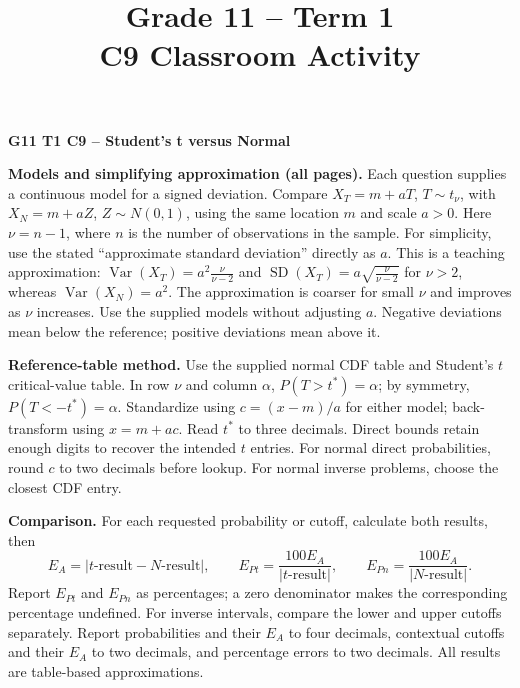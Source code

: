 \makeatletter
{}
\makeatother

\title{Grade 11 -- Term 1 \\ C9 Classroom Activity}
\author{}\date{}
\pagestyle{empty}
\linespread{1.04}
\setlength{\parskip}{3pt}

	\begin{center}{\large\bfseries G11 T1 C9 -- Student's t versus Normal}\end{center}
	\textbf{Models and simplifying approximation (all pages).} Each question supplies a continuous model for a signed deviation. Compare $X_T=m+aT$, $T\sim t_\nu$, with $X_N=m+aZ$, $Z\sim N(0,1)$, using the same location $m$ and scale $a>0$. Here $\boxed{\nu=n-1}$, where $n$ is the number of observations in the sample. For simplicity, use the stated ``approximate standard deviation'' directly as $a$. This is a teaching approximation: $\operatorname{Var}(X_T)=a^2\frac{\nu}{\nu-2}$ and $\operatorname{SD}(X_T)=a\sqrt{\frac{\nu}{\nu-2}}$ for $\nu>2$, whereas $\operatorname{Var}(X_N)=a^2$. The approximation is coarser for small $\nu$ and improves as $\nu$ increases. Use the supplied models without adjusting $a$. Negative deviations mean below the reference; positive deviations mean above it.

	\textbf{Reference-table method.} Use the supplied normal CDF table and Student's $t$ critical-value table. In row $\nu$ and column $\alpha$, $P(T>t^*)=\alpha$; by symmetry, $P(T<-t^*)=\alpha$. Standardize using $c=(x-m)/a$ for either model; back-transform using $x=m+ac$. Read $t^*$ to three decimals. Direct bounds retain enough digits to recover the intended $t$ entries. For normal direct probabilities, round $c$ to two decimals before lookup. For normal inverse problems, choose the closest CDF entry.

	\textbf{Comparison.} For each requested probability or cutoff, calculate both results, then
	\[
	E_A=|\text{$t$-result}-\text{$N$-result}|,\qquad
	E_{Pt}=\frac{100E_A}{|\text{$t$-result}|},\qquad
	E_{Pn}=\frac{100E_A}{|\text{$N$-result}|}.
	\]
	Report $E_{Pt}$ and $E_{Pn}$ as percentages; a zero denominator makes the corresponding percentage undefined. For inverse intervals, compare the lower and upper cutoffs separately. Report probabilities and their $E_A$ to four decimals, contextual cutoffs and their $E_A$ to two decimals, and percentage errors to two decimals. All results are table-based approximations.

